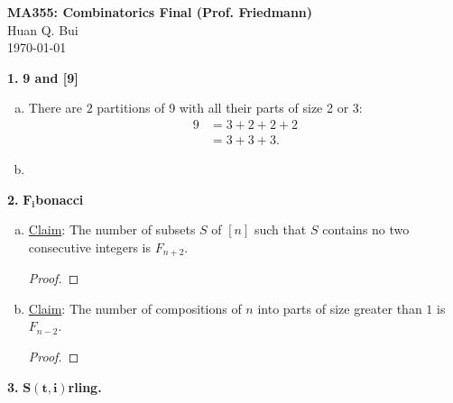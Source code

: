 \documentclass[11pt]{article}
\begin{document}
	\begin{framed}
\begin{center}
{\large \bf MA355: Combinatorics Final (Prof. Friedmann)}\\
{ Huan Q. Bui}\\
\today
\end{center}
\end{framed}







\noindent \textbf{1.} \textbf{9 and [9]}
\begin{enumerate}[(a)]
	\item There are $\boxed{2}$ partitions of 9 with all their parts of size 2 or 3: 
	\begin{align*}
	9 &= 3 + 2 + 2 + 2 \\
	&= 3+3+3.
	\end{align*}
	
	
	\item 
\end{enumerate}



\newpage



\noindent \textbf{2.} \textbf{$\mathbf{F_i}$bonacci}


\begin{enumerate}[(a)]
	\item \underline{Claim}: The number of subsets $S$ of $[n]$ such that $S$ contains no two consecutive integers is ${F_{n+2}}$.
	
	
	\begin{proof}
		
	\end{proof} 
	
	
	
	
	
	
	\item \underline{Claim}: The number of compositions of $n$ into parts of size greater than $1$ is $F_{n-2}$.
	
	
	\begin{proof}
		
	\end{proof}

\end{enumerate}



\newpage



\noindent \textbf{3.} \textbf{$\mathbf{S(t,i)}$rling.}
\end{document}
